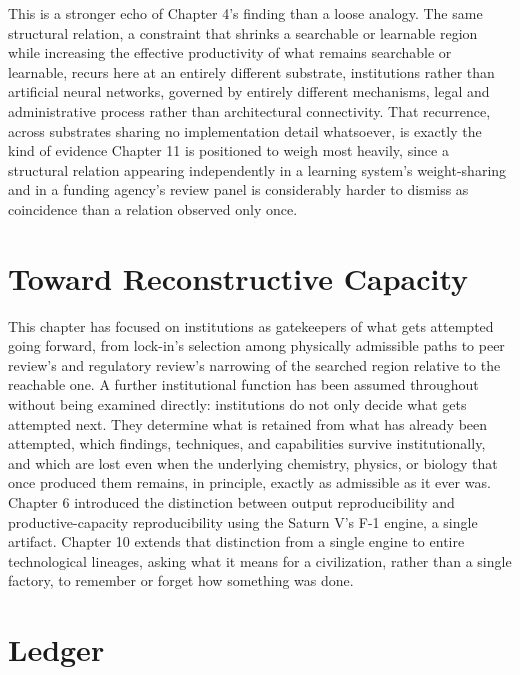 \documentclass[11pt]{book}
\begin{document}
This is a stronger echo of Chapter 4's finding than a loose analogy. The same structural relation, a constraint that shrinks a searchable or learnable region while increasing the effective productivity of what remains searchable or learnable, recurs here at an entirely different substrate, institutions rather than artificial neural networks, governed by entirely different mechanisms, legal and administrative process rather than architectural connectivity. That recurrence, across substrates sharing no implementation detail whatsoever, is exactly the kind of evidence Chapter 11 is positioned to weigh most heavily, since a structural relation appearing independently in a learning system's weight-sharing and in a funding agency's review panel is considerably harder to dismiss as coincidence than a relation observed only once.

\section{Toward Reconstructive Capacity}

This chapter has focused on institutions as gatekeepers of what gets attempted going forward, from lock-in's selection among physically admissible paths to peer review's and regulatory review's narrowing of the searched region relative to the reachable one. A further institutional function has been assumed throughout without being examined directly: institutions do not only decide what gets attempted next. They determine what is retained from what has already been attempted, which findings, techniques, and capabilities survive institutionally, and which are lost even when the underlying chemistry, physics, or biology that once produced them remains, in principle, exactly as admissible as it ever was. Chapter 6 introduced the distinction between output reproducibility and productive-capacity reproducibility using the Saturn V's F-1 engine, a single artifact. Chapter 10 extends that distinction from a single engine to entire technological lineages, asking what it means for a civilization, rather than a single factory, to remember or forget how something was done.

\section{Ledger}
\end{document}
